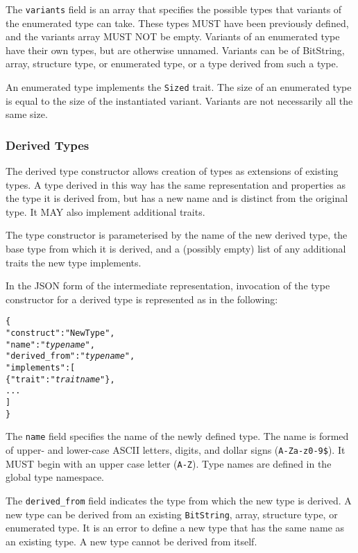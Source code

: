 \documentclass[10pt,twocolumn,a4paper]{article}
\newcommand{\code}[1]{\texttt{#1}}
\begin{document}
The \code{variants} field is an array that specifies the possible types
that variants of the enumerated type can take. These types MUST have been
previously defined, and the variants array MUST NOT be empty. Variants of
an enumerated type have their own types, but are otherwise unnamed.
Variants can be of BitString, array, structure type, or enumerated type, or
a type derived from such a type.

An enumerated type implements the \code{Sized} trait. The size of an enumerated type
is equal to the size of the instantiated variant. Variants are not
necessarily all the same size.

\subsubsection{Derived Types}

The derived type constructor allows creation of types as extensions of
existing types. A type derived in this way has the same representation
and properties as the type it is derived from, but has a new name and is
distinct from the original type. It MAY also implement additional traits.

The type constructor is parameterised by the name of the new derived type,
the base type from which it is derived, and a (possibly empty) list of any
additional traits the new type implements.

In the JSON form of the intermediate representation, invocation of the
type constructor for a derived type is represented as in the following:
\footnotesize
\begin{alltt}
  \{
    "construct"     : "NewType",
    "name"          : "\emph{type name}",
    "derived\_from"  : "\emph{type name}",
    "implements"    : [
      \{"trait" : "\emph{trait name}"\},
      ...
    ]
  \}
\end{alltt}
\normalsize
The \code{name} field specifies the name of the newly defined type. The
name is formed of upper- and lower-case ASCII letters, digits, and dollar
signs (\code{A-Za-z0-9\$}).  It MUST begin with an upper case letter
(\code{A-Z}). Type names are defined in the global type namespace.

The \code{derived\_from} field indicates the type from which the new type is
derived.  A new type can be derived from an existing \code{BitString},
array, structure type, or enumerated type. It is an error to define a new
type that has the same name as an existing type. A new type cannot be
derived from itself.
\end{document}
